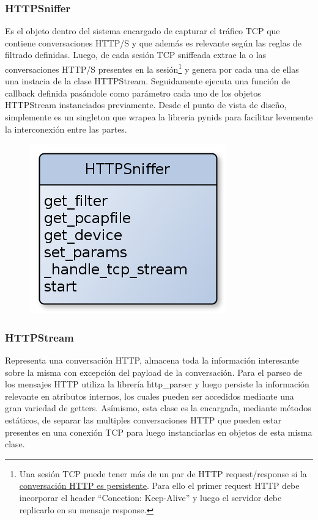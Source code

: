 \subsubsection{HTTPSniffer}

Es el objeto dentro del sistema encargado de capturar el tráfico TCP que contiene conversaciones HTTP/S y que además es relevante según las reglas de filtrado definidas. Luego, de cada sesión TCP sniffeada extrae la o las conversaciones HTTP/S presentes en la sesión\footnote{Una sesión TCP puede tener más de un par de HTTP request/response si la \href{http://en.wikipedia.org/wiki/HTTP_persistent_connection}{conversación HTTP es persistente}. Para ello el primer request HTTP debe incorporar el header ``Conection: Keep-Alive'' y luego el servidor debe replicarlo en su mensaje response.} y genera por cada una de ellas una instacia de la clase HTTPStream. Seguidamente ejecuta una función de callback definida pasándole como parámetro cada uno de los objetos HTTPStream instanciados previamente. Desde el punto de vista de diseño, simplemente es un singleton que wrapea la libreria pynids para facilitar levemente la interconexión entre las partes.

\begin{figure}[hbtp]
    \centering
	\includegraphics[scale=0.40]{img/HTTPSniffer.png} 
\end{figure}

\subsubsection{HTTPStream}

Representa una conversación HTTP, almacena toda la información interesante sobre la misma con excepción del payload de la conversación. Para el parseo de los mensajes HTTP utiliza la librería http\_parser y luego persiste la información relevante en atributos internos, los cuales pueden ser accedidos mediante una gran variedad de getters. Asímismo, esta clase es la encargada, mediante métodos estáticos, de separar las multiples conversaciones HTTP que pueden estar presentes en una
conexión TCP para luego instanciarlas en objetos de esta misma clase.

